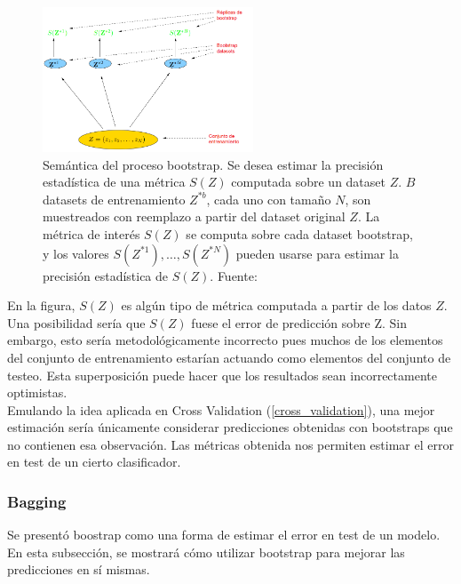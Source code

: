 \begin{figure}[h!]
\begin{center}
  \includegraphics[width=0.56\textwidth]{Kap1/bootstrap.png} 
\end{center}
\caption{ Semántica del proceso bootstrap. Se desea estimar la precisión estadística de una métrica $S(Z)$ computada sobre un dataset $Z$. $B$ datasets de entrenamiento $Z^{*b}$, cada uno con tamaño $N$, son muestreados con reemplazo a partir del dataset original $Z$. La métrica de interés $S(Z)$ se computa sobre cada dataset bootstrap, y los valores $S(Z^{*1}), \ldots, S(Z^{*N})$ pueden usarse para estimar la precisión estadística de $S(Z)$.  Fuente: \protect\cite{statisticallearning} }
\label{fig:bootstrap}
\end{figure}


En la figura, $S(Z)$ es algún tipo de métrica computada a partir de los datos $Z$. Una posibilidad sería que $S(Z)$ fuese el error de predicción sobre Z. Sin embargo, esto sería metodológicamente incorrecto pues muchos de los elementos del conjunto de entrenamiento estarían actuando como elementos del conjunto de testeo. Esta superposición puede hacer que los resultados sean incorrectamente optimistas.  \\

Emulando la idea aplicada en Cross Validation (\ref{cross_validation}), una mejor estimación sería únicamente considerar predicciones obtenidas con bootstraps que no contienen esa observación.  Las métricas obtenida nos permiten estimar el error en test de un cierto clasificador.

\subsubsection{Bagging}

Se presentó boostrap como una forma de estimar el error en test de un modelo. En esta subsección, se mostrará cómo utilizar bootstrap para mejorar las predicciones en sí mismas. \\

